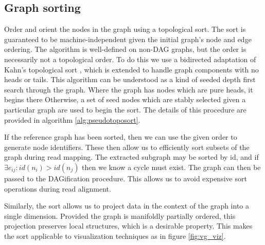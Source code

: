 \subsection{Graph sorting}

Order and orient the nodes in the graph using a topological sort.
The sort is guaranteed to be machine-independent given the initial graph's node and edge ordering.
The algorithm is well-defined on non-DAG graphs, but the order is necessarily not a topological order.
To do this we use a bidirected adaptation of Kahn's topological sort \cite{kahn1962topological}, which is extended to handle graph components with no heads or tails.
This algorithm can be understood as a kind of seeded depth first search through the graph.
Where the graph has nodes which are pure heads, it begins there
Otherwise, a set of seed nodes which are stably selected given a particular graph are used to begin the sort.
The details of this procedure are provided in algorithm \ref{alg:pseudotoposort}.

If the reference graph has been sorted, then we can use the given order to generate node identifiers.
These then allow us to efficiently sort subsets of the graph during read mapping.
The extracted subgraph may be sorted by id, and if $\exists e_{ij} : id(n_i) > id(n_j)$ then we know a cycle must exist.
The graph can then be passed to the DAGification procedure.
This allows us to avoid expensive sort operations during read alignment.

Similarly, the sort allows us to project data in the context of the graph into a single dimension.
Provided the graph is manifoldly partially ordered, this projection preserves local structures, which is a desirable property.
This makes the sort applicable to visualization techniques as in figure \ref{fig:vg_viz}.


